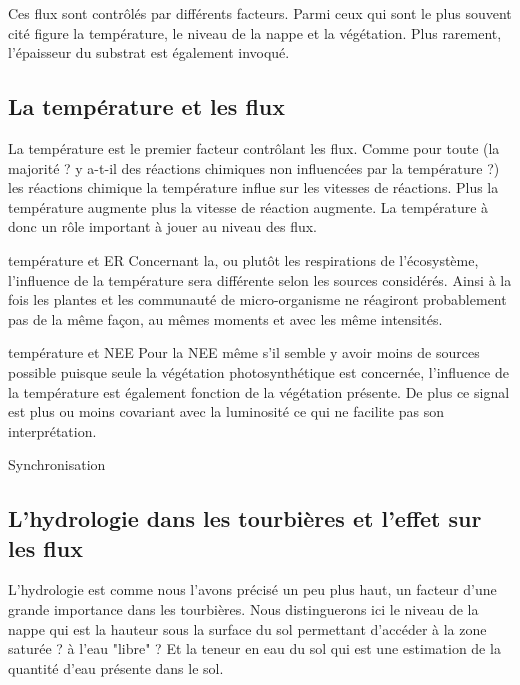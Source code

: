 Ces flux sont contrôlés par différents facteurs.
Parmi ceux qui sont le plus souvent cité figure la température, le niveau de la nappe et la végétation.
Plus rarement, l'épaisseur du substrat est également invoqué.

\subsection{La température et les flux}
La température est le premier facteur contrôlant les flux.
Comme pour toute (la majorité ? y a-t-il des réactions chimiques non influencées par la température ?) les réactions chimique la température influe sur les vitesses de réactions. 
Plus la température augmente plus la vitesse de réaction augmente.
La température à donc un rôle important à jouer au niveau des flux.

température et ER
Concernant la, ou plutôt les respirations de l'écosystème, l'influence de la température sera différente selon les sources considérés.
Ainsi à la fois les plantes et les communauté de micro-organisme ne réagiront probablement pas de la même façon, au mêmes moments et avec les même intensités.

température et NEE
Pour la NEE même s'il semble y avoir moins de sources possible puisque seule la végétation photosynthétique est concernée, l'influence de la température est également fonction de la végétation présente.
De plus ce signal est plus ou moins covariant avec la luminosité ce qui ne facilite pas son interprétation.

Synchronisation


\subsection{L'hydrologie dans les tourbières et l'effet sur les flux}
L'hydrologie est comme nous l'avons précisé un peu plus haut, un facteur d'une grande importance dans les tourbières.
Nous distinguerons ici le niveau de la nappe qui est la hauteur sous la surface du sol permettant d'accéder à la zone saturée ? à l'eau "libre" ?
Et la teneur en eau du sol qui est une estimation de la quantité d'eau présente dans le sol.

